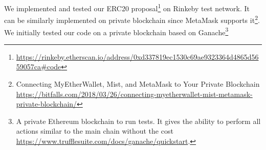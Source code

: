 We implemented and tested our ERC20 proposal\footnote{\url{https://rinkeby.etherscan.io/address/0xd337819ec1530c69ae9323364d4865d5659057ca\#code}} on Rinkeby test network. It can be similarly implemented on private blockchain since MetaMask supports it\footnote{Connecting MyEtherWallet, Mist, and MetaMask to Your Private Blockchain \url{https://bitfalls.com/2018/03/26/connecting-myetherwallet-mist-metamask-private-blockchain/}}. We initially tested our code on a private blockchain based on Ganache\footnote{A private Ethereum blockchain to run tests. It gives the ability to perform all actions similar to the main chain without the cost \url{https://www.trufflesuite.com/docs/ganache/quickstart}.}
\par

%
%
%
%
%
